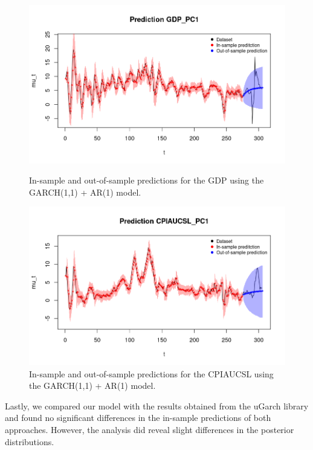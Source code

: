 \begin{figure}[H]
    \centering
    \begin{minipage}{0.49\textwidth}
        \centering
        \includegraphics[width=\textwidth]{images/5-GARCH/gdp_prediction.png}
        \caption{In-sample and out-of-sample predictions for the GDP using the GARCH(1,1) + AR(1) model.}
        \label{fig:GARCH1,1_AR1_gdp_prediction} 
    \end{minipage}\hfill
    \begin{minipage}{0.49\textwidth}
        \centering
        \includegraphics[width=\textwidth]{images/5-GARCH/infl_prediction.png}
        \caption{In-sample and out-of-sample predictions for the CPIAUCSL using the GARCH(1,1) + AR(1) model.}
        \label{fig:GARCH1,1_AR1_infl_prediction}
    \end{minipage}
\end{figure}
Lastly, we compared our model with the results obtained from the uGarch library and found no significant differences in the in-sample predictions of both approaches. However, the analysis did reveal slight differences in the posterior distributions.